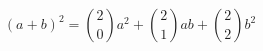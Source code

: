 \documentclass[nofonts]{ctexart}
\begin{document}
\[
	(a+b)^2 = \binom{2}{0}a^2 + \binom{2}{1}ab + \binom{2}{2}b^2
\]
\end{document}
